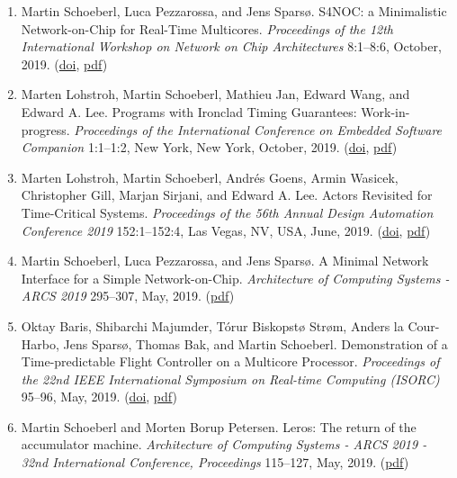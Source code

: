 \begin{enumerate}
\item Martin Schoeberl, Luca Pezzarossa, and Jens Spars{\o}.
 S4NOC: a Minimalistic Network-on-Chip for Real-Time Multicores.
 \emph{Proceedings of the 12th International Workshop on Network on Chip Architectures} 8:1--8:6, October, 2019.
(\href{http://dx.doi.org/10.1145/3356045.3360714}{doi}, \href{https://www.jopdesign.com/doc/s4nocimpl.pdf}{pdf})

\item Marten Lohstroh, Martin Schoeberl, Mathieu Jan, Edward Wang, and Edward A. Lee.
 Programs with Ironclad Timing Guarantees: Work-in-progress.
 \emph{Proceedings of the International Conference on Embedded Software Companion} 1:1--1:2, New York, New York, October, 2019.
(\href{http://dx.doi.org/10.1145/3349568.3351553}{doi}, \href{https://www.jopdesign.com/doc/reactorsRT.pdf}{pdf})

\item Marten Lohstroh, Martin Schoeberl, Andr{\'e}s Goens, Armin Wasicek, Christopher Gill, Marjan Sirjani, and Edward A. Lee.
 Actors Revisited for Time-Critical Systems.
 \emph{Proceedings of the 56th Annual Design Automation Conference 2019} 152:1--152:4, Las Vegas, NV, USA, June, 2019.
(\href{http://dx.doi.org/10.1145/3316781.3323469}{doi}, \href{https://www.jopdesign.com/doc/actorsRevisited.pdf}{pdf})

\item Martin Schoeberl, Luca Pezzarossa, and Jens Spars{\o}.
 A Minimal Network Interface for a Simple Network-on-Chip.
 \emph{Architecture of Computing Systems - ARCS 2019} 295--307, May, 2019.
(\href{https://www.jopdesign.com/doc/s4nocni.pdf}{pdf})

\item Oktay Baris, Shibarchi Majumder, T{\'o}rur Biskopst{\o} Str{\o}m, Anders la Cour-Harbo, Jens Spars{\o}, Thomas Bak, and Martin Schoeberl.
 Demonstration of a Time-predictable Flight Controller on a Multicore Processor.
 \emph{Proceedings of the 22nd IEEE International Symposium on Real-time Computing (ISORC)} 95--96, May, 2019.
(\href{http://dx.doi.org/10.1109/ISORC.2019.00029}{doi}, \href{https://www.jopdesign.com/doc/dronecmp.pdf}{pdf})

\item Martin Schoeberl and {Morten Borup} Petersen.
 Leros: The return of the accumulator machine.
 \emph{Architecture of Computing Systems - ARCS 2019 - 32nd International Conference, Proceedings} 115--127, May, 2019.
(\href{https://www.jopdesign.com/doc/leros32.pdf}{pdf})


\end{enumerate}
